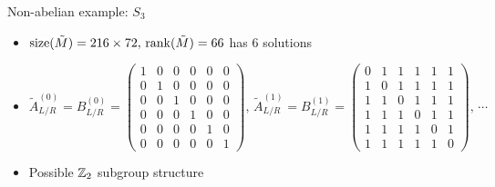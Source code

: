 \documentclass{fdubeamer}
\begin{document}
\begin{frame}{Non-abelian example: \texorpdfstring{$S_3$}{𝑆₃}}
\begin{itemize}
    \begin{itemize}
      \item $\operatorname{size}(\tilde{M})=216\times72, \, \operatorname{rank}(\tilde{M})=66$
        \textrightarrow{} has 6 solutions \\[1ex]
      \item $
          \tilde{A}^{(0)}_{L/R} = B^{(0)}_{L/R} = \left( \begin{smallmatrix}
            1 & 0 & 0 & 0 & 0 & 0 \\
            0 & 1 & 0 & 0 & 0 & 0 \\
            0 & 0 & 1 & 0 & 0 & 0 \\
            0 & 0 & 0 & 1 & 0 & 0 \\
            0 & 0 & 0 & 0 & 1 & 0 \\
            0 & 0 & 0 & 0 & 0 & 1
          \end{smallmatrix} \right)\!, \,
          \tilde{A}^{(1)}_{L/R} = B^{(1)}_{L/R} = \left( \begin{smallmatrix}
            0 & 1 & 1 & 1 & 1 & 1 \\
            1 & 0 & 1 & 1 & 1 & 1 \\
            1 & 1 & 0 & 1 & 1 & 1 \\
            1 & 1 & 1 & 0 & 1 & 1 \\
            1 & 1 & 1 & 1 & 0 & 1 \\
            1 & 1 & 1 & 1 & 1 & 0
          \end{smallmatrix} \right)\!, \, \cdots
        $ \\[1ex]
      \item Possible $\mathbb{Z}_2$ subgroup structure
    \end{itemize}
\end{itemize}

\end{frame}
\end{document}
